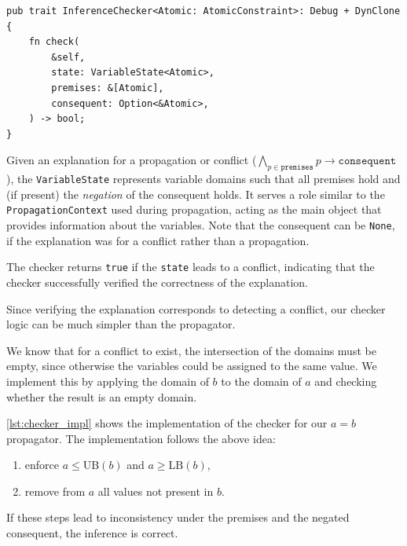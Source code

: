 \documentclass{article}
\begin{document}
\begin{verbatim}
pub trait InferenceChecker<Atomic: AtomicConstraint>: Debug + DynClone {
    fn check(
        &self,
        state: VariableState<Atomic>,
        premises: &[Atomic],
        consequent: Option<&Atomic>,
    ) -> bool;
}
\end{verbatim}

Given an explanation for a propagation or conflict ($\bigwedge_{p \in \mathtt{premises}} p \rightarrow \mathtt{consequent}$), the \texttt{VariableState} represents variable domains such that all premises hold and (if present) the \emph{negation} of the consequent holds.
It serves a role similar to the \texttt{Propagation\-Context} used during propagation, acting as the main object that provides information about the variables.
Note that the consequent can be \texttt{None}, if the explanation was for a conflict rather than a propagation.

The checker returns \texttt{true} if the \texttt{state} leads to a conflict, indicating that the checker successfully verified the correctness of the explanation.

Since verifying the explanation corresponds to detecting a conflict, our checker logic can be much simpler than the propagator.

We know that for a conflict to exist, the intersection of the domains must be empty, since otherwise the variables could be assigned to the same value. We implement this by applying the domain of $b$ to the domain of $a$ and checking whether the result is an empty domain.

\autoref{lst:checker_impl} shows the implementation of the checker for our $a = b$ propagator. The implementation follows the above idea:
\begin{enumerate}
    \item enforce $a \leq \mathrm{UB}(b)$ and $a \geq \mathrm{LB}(b)$,
    \item remove from $a$ all values not present in $b$.
\end{enumerate}
If these steps lead to inconsistency under the premises and the negated consequent, the inference is correct.
\end{document}
